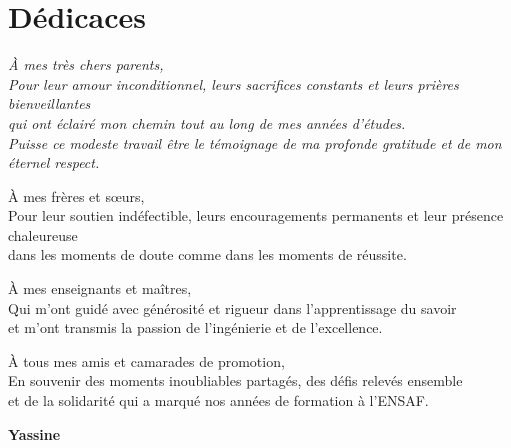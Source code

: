 \chapter*{D\'edicaces}

\vspace{1.8cm}

\begin{center}
\itshape
\`A mes tr\`es chers parents,\\[0.15cm]
Pour leur amour inconditionnel, leurs sacrifices constants et leurs pri\`eres bienveillantes\\
qui ont \'eclair\'e mon chemin tout au long de mes ann\'ees d'\'etudes.\\
Puisse ce modeste travail \^etre le t\'emoignage de ma profonde gratitude et de mon \'eternel respect.

\vspace{0.8cm}

\`A mes fr\`eres et s\oe urs,\\[0.15cm]
Pour leur soutien ind\'efectible, leurs encouragements permanents et leur pr\'esence chaleureuse\\
dans les moments de doute comme dans les moments de r\'eussite.

\vspace{0.8cm}

\`A mes enseignants et ma\^itres,\\[0.15cm]
Qui m'ont guid\'e avec g\'en\'erosit\'e et rigueur dans l'apprentissage du savoir\\
et m'ont transmis la passion de l'ing\'enierie et de l'excellence.

\vspace{0.8cm}

\`A tous mes amis et camarades de promotion,\\[0.15cm]
En souvenir des moments inoubliables partag\'es, des d\'efis relev\'es ensemble\\
et de la solidarit\'e qui a marqu\'e nos ann\'ees de formation \`a l'ENSAF.

\vspace{1.5cm}

\textbf{\upshape Yassine}
\end{center}
